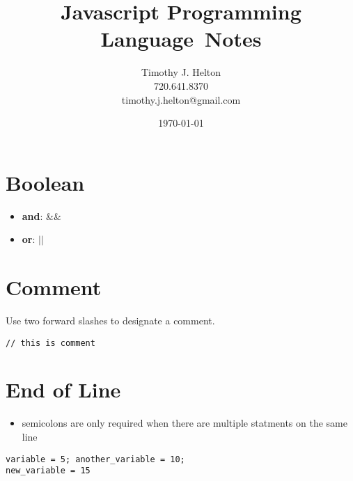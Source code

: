 \documentclass{article}
\newcommand{\topic}{Javascript Programming Language}
\begin{document}
\title{\topic \ Notes}
\author{Timothy J. Helton\\720.641.8370\\timothy.j.helton@gmail.com}
\date{\today}

\begin{titlingpage}
  \maketitle
\end{titlingpage}

\hypertarget{toc}{}
\tableofcontents
\newpage

\listoffigures
\listoftables
\newpage

\printnomenclature[0.75in]
\hfill

\newpage

\pagestyle{fancy}
\section{Boolean}
\begin{itemize}
  \item \textbf{and}: \&\&
  \item \textbf{or}: $\vert\vert$ 
\end{itemize}

\section{Comment}
Use two forward slashes to designate a comment.

\begin{lstlisting}
// this is comment
\end{lstlisting}

\section{End of Line}
\begin{itemize}
  \item semicolons are only required when there are multiple statments on the
    same line
\end{itemize}

\begin{lstlisting}
variable = 5; another_variable = 10;
new_variable = 15
\end{lstlisting}
\end{document}
